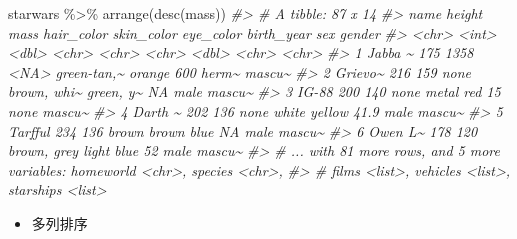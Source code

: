\documentclass[
]{book}
\newenvironment{Shaded}{\begin{snugshade}}{\end{snugshade}}
\newcommand{\CommentTok}[1]{\textcolor[rgb]{0.56,0.35,0.01}{\textit{#1}}}
\newcommand{\FunctionTok}[1]{\textcolor[rgb]{0.00,0.00,0.00}{#1}}
\newcommand{\NormalTok}[1]{#1}
\newcommand{\SpecialCharTok}[1]{\textcolor[rgb]{0.00,0.00,0.00}{#1}}
\providecommand{\tightlist}{%
  \setlength{\itemsep}{0pt}\setlength{\parskip}{0pt}}
\begin{document}
\begin{Shaded}
\begin{Highlighting}[]
\NormalTok{starwars }\SpecialCharTok{\%\textgreater{}\%} 
  \FunctionTok{arrange}\NormalTok{(}\FunctionTok{desc}\NormalTok{(mass))}
\CommentTok{\#\textgreater{} \# A tibble: 87 x 14}
\CommentTok{\#\textgreater{}   name    height  mass hair\_color  skin\_color  eye\_color birth\_year sex   gender}
\CommentTok{\#\textgreater{}   \textless{}chr\textgreater{}    \textless{}int\textgreater{} \textless{}dbl\textgreater{} \textless{}chr\textgreater{}       \textless{}chr\textgreater{}       \textless{}chr\textgreater{}          \textless{}dbl\textgreater{} \textless{}chr\textgreater{} \textless{}chr\textgreater{} }
\CommentTok{\#\textgreater{} 1 Jabba \textasciitilde{}    175  1358 \textless{}NA\textgreater{}        green{-}tan,\textasciitilde{} orange         600   herm\textasciitilde{} mascu\textasciitilde{}}
\CommentTok{\#\textgreater{} 2 Grievo\textasciitilde{}    216   159 none        brown, whi\textasciitilde{} green, y\textasciitilde{}       NA   male  mascu\textasciitilde{}}
\CommentTok{\#\textgreater{} 3 IG{-}88      200   140 none        metal       red             15   none  mascu\textasciitilde{}}
\CommentTok{\#\textgreater{} 4 Darth \textasciitilde{}    202   136 none        white       yellow          41.9 male  mascu\textasciitilde{}}
\CommentTok{\#\textgreater{} 5 Tarfful    234   136 brown       brown       blue            NA   male  mascu\textasciitilde{}}
\CommentTok{\#\textgreater{} 6 Owen L\textasciitilde{}    178   120 brown, grey light       blue            52   male  mascu\textasciitilde{}}
\CommentTok{\#\textgreater{} \# ... with 81 more rows, and 5 more variables: homeworld \textless{}chr\textgreater{}, species \textless{}chr\textgreater{},}
\CommentTok{\#\textgreater{} \#   films \textless{}list\textgreater{}, vehicles \textless{}list\textgreater{}, starships \textless{}list\textgreater{}}
\end{Highlighting}
\end{Shaded}

\begin{itemize}
\tightlist
\item
  多列排序
\end{itemize}
\end{document}
